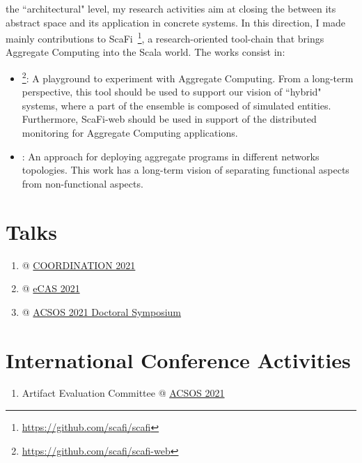 \documentclass[11pt]{article}
\begin{document}
 the ``architectural" level, my research activities aim at closing the  between
 its abstract space and its application in concrete systems. 
%
In this direction, I made mainly contributions 
 to ScaFi~\cite{scafi}\footnote{\url{https://github.com/scafi/scafi}}, 
 a research-oriented tool-chain that brings Aggregate Computing into the Scala world.
 The works consist in:

\begin{itemize}
  \item \textit{}\footnote{\url{https://github.com/scafi/scafi-web}}: 
	A playground to experiment with Aggregate Computing. 
	From a long-term perspective, this tool should be used to support our vision of ``hybrid" systems,
	where a part of the ensemble is composed of simulated entities. 
	Furthermore, ScaFi-web should be used in support of the distributed monitoring for Aggregate Computing applications.
  \item \textit{}: 
	An approach for deploying aggregate programs in different networks topologies. 
	This work has a long-term vision of separating functional aspects from non-functional aspects.
\end{itemize}

\section{Talks}
\begin{enumerate}
	\item {} @ \href{https://www.discotec.org/2021/programme}{COORDINATION 2021}
	\item {} @ \href{https://apice.unibo.it/xwiki/bin/view/ECAS2021/Program}{eCAS 2021}
	\item {} @ \href{https://conf.researchr.org/program/acsos-2021/program-acsos-2021/?date=Fri%201%20Oct%202021}{ACSOS 2021 Doctoral Symposium}
\end{enumerate}
\section{International Conference Activities}
\begin{enumerate}
	\item Artifact Evaluation Committee @ \href{https://conf.researchr.org/committee/acsos-2021/acsos-2021-papers-artifact-evaluation-committee}{ACSOS 2021}

\end{enumerate}
\end{document}
